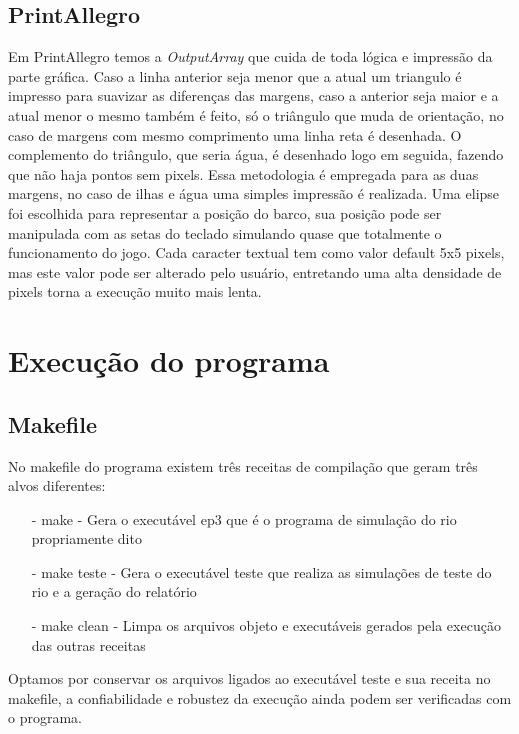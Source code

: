 \documentclass[a4paper,11pt]{article}
\begin{document}
\subsection{PrintAllegro}
Em PrintAllegro temos a \textit{OutputArray} que cuida de toda lógica e impressão da parte gráfica. Caso a linha anterior seja menor que a atual um triangulo é impresso para suavizar as diferenças das margens, caso a anterior seja maior e a atual menor o mesmo também é feito, só o triângulo que muda de orientação, no caso de margens com mesmo comprimento uma linha reta é desenhada. O complemento do triângulo, que seria água, é desenhado logo em seguida, fazendo que não haja pontos sem pixels. Essa metodologia é empregada para as duas margens, no caso de ilhas e água uma simples impressão é realizada.
Uma elipse foi escolhida para representar a posição do barco, sua posição pode ser manipulada com as setas do teclado simulando quase que totalmente o funcionamento do jogo. Cada caracter textual tem como valor default 5x5 pixels, mas este valor pode ser alterado pelo usuário, entretando uma alta densidade de pixels torna a execução muito mais lenta.

\section{Execu\c{c}ão do programa}
\subsection{Makefile}
No makefile do programa existem três receitas de compila\c{c}ão que geram três alvos diferentes:
\begin{enumerate}
\item[-]{make - Gera o executável ep3 que é o programa de simula\c{c}ão do rio propriamente dito}
\item[-]{make teste - Gera o executável teste que realiza as simula\c{c}ões de teste do rio e a gera\c{c}ão do relatório}
\item[-]{make clean - Limpa os arquivos objeto e executáveis gerados pela execu\c{c}ão das outras receitas}
\end{enumerate}
Optamos por conservar os arquivos ligados ao executável teste e sua receita no makefile, a confiabilidade e robustez da execução ainda podem ser verificadas com o programa.
\end{document}
